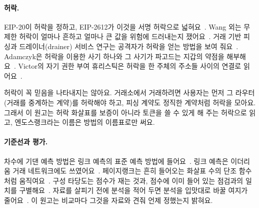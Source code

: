 \paragraph{허락.}
EIP-20이 허락을 정하고, EIP-2612가 이것을 서명 허락으로 넓혀요~\cite{vogelsteller2015erc20,lundfall2020permit}. Wang 외는 무제한 허락이 얼마나 흔하고 얼마나 큰 값을 위험에 드러내는지 쟀어요~\cite{wang2022unlimited}. 거래 기반 피싱과 드레이너(drainer) 서비스 연구는 공격자가 허락을 얻는 방법을 보여 줘요~\cite{he2023txphishscope,he2025drainer}. Adamczyk은 허락을 이용한 사기 하나와 그 사기가 파고드는 지갑의 약점을 해부해요~\cite{adamczyk2025approval}. Victor의 자기 권한 부여 휴리스틱은 허락을 한 주체의 주소들 사이의 연결로 읽어요~\cite{victor2020clustering}.

허락이 꼭 믿음을 나타내지는 않아요. 거래소에서 거래하려면 사용자는 먼저 그 라우터(거래를 중계하는 계약)를 허락해야 하고, 피싱 계약도 정직한 계약처럼 허락을 모아요. 그래서 이 원고는 허락 화살표를 보증이 아니라 토큰을 쓸 수 있게 해 주는 허락으로 읽고, 엔도스랭크라는 이름은 방법의 이름표로만 써요.

\paragraph{기준선과 평가.}
차수에 기댄 예측 방법은 링크 예측의 표준 예측 방법에 들어요~\cite{libennowell2007link}. 링크 예측은 이더리움 거래 네트워크에도 쓰였어요~\cite{lin2022tracking}. 페이지랭크는 흔히 들어오는 화살표 수의 단조 함수처럼 움직여요~\cite{fortunato2008indegree}. 구성 타당도는 점수가 재는 것과, 점수에 이미 들어 있는 점검과의 일치를 구별해요~\cite{cronbach1955construct}. 자료를 살피기 전에 분석을 적어 두면 분석을 입맛대로 바꿀 여지가 줄어요~\cite{nosek2018preregistration}. 이 원고는 비교마다 그것을 자료와 견줘 언제 정했는지 밝혀요.

